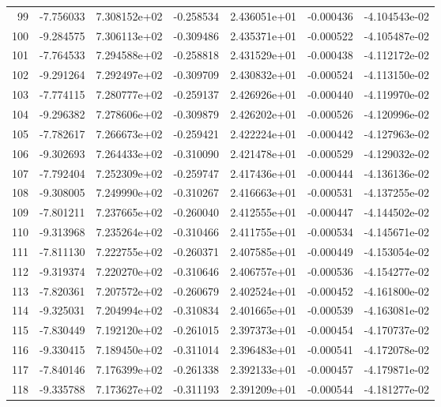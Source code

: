 \begin{tabular}{rrrrrrr}
  99 &  -7.756033 &  7.308152e+02 & -0.258534 &  2.436051e+01 &   -0.000436 & -4.104543e-02 \\
 100 &  -9.284575 &  7.306113e+02 & -0.309486 &  2.435371e+01 &   -0.000522 & -4.105487e-02 \\
 101 &  -7.764533 &  7.294588e+02 & -0.258818 &  2.431529e+01 &   -0.000438 & -4.112172e-02 \\
 102 &  -9.291264 &  7.292497e+02 & -0.309709 &  2.430832e+01 &   -0.000524 & -4.113150e-02 \\
 103 &  -7.774115 &  7.280777e+02 & -0.259137 &  2.426926e+01 &   -0.000440 & -4.119970e-02 \\
 104 &  -9.296382 &  7.278606e+02 & -0.309879 &  2.426202e+01 &   -0.000526 & -4.120996e-02 \\
 105 &  -7.782617 &  7.266673e+02 & -0.259421 &  2.422224e+01 &   -0.000442 & -4.127963e-02 \\
 106 &  -9.302693 &  7.264433e+02 & -0.310090 &  2.421478e+01 &   -0.000529 & -4.129032e-02 \\
 107 &  -7.792404 &  7.252309e+02 & -0.259747 &  2.417436e+01 &   -0.000444 & -4.136136e-02 \\
 108 &  -9.308005 &  7.249990e+02 & -0.310267 &  2.416663e+01 &   -0.000531 & -4.137255e-02 \\
 109 &  -7.801211 &  7.237665e+02 & -0.260040 &  2.412555e+01 &   -0.000447 & -4.144502e-02 \\
 110 &  -9.313968 &  7.235264e+02 & -0.310466 &  2.411755e+01 &   -0.000534 & -4.145671e-02 \\
 111 &  -7.811130 &  7.222755e+02 & -0.260371 &  2.407585e+01 &   -0.000449 & -4.153054e-02 \\
 112 &  -9.319374 &  7.220270e+02 & -0.310646 &  2.406757e+01 &   -0.000536 & -4.154277e-02 \\
 113 &  -7.820361 &  7.207572e+02 & -0.260679 &  2.402524e+01 &   -0.000452 & -4.161800e-02 \\
 114 &  -9.325031 &  7.204994e+02 & -0.310834 &  2.401665e+01 &   -0.000539 & -4.163081e-02 \\
 115 &  -7.830449 &  7.192120e+02 & -0.261015 &  2.397373e+01 &   -0.000454 & -4.170737e-02 \\
 116 &  -9.330415 &  7.189450e+02 & -0.311014 &  2.396483e+01 &   -0.000541 & -4.172078e-02 \\
 117 &  -7.840146 &  7.176399e+02 & -0.261338 &  2.392133e+01 &   -0.000457 & -4.179871e-02 \\
 118 &  -9.335788 &  7.173627e+02 & -0.311193 &  2.391209e+01 &   -0.000544 & -4.181277e-02 \\

\end{tabular}
